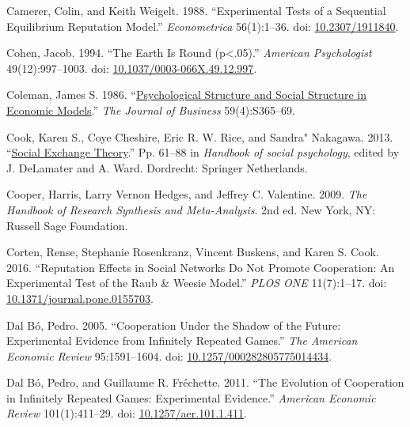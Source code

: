 \documentclass[
  11pt,
]{article}
\newlength{\cslhangindent}
\newlength{\cslentryspacingunit} %
\newenvironment{CSLReferences}[2] %
 {%
  \setlength{\parindent}{0pt}
  \ifodd #1
  \let\oldpar\par
  \def\par{\hangindent=\cslhangindent\oldpar}
  \fi
  \setlength{\parskip}{#2\cslentryspacingunit}
 }%
 {}
\begin{document}
\begin{CSLReferences}{1}{0}
\leavevmode{}%
Camerer, Colin, and Keith Weigelt. 1988. {``Experimental Tests of a Sequential Equilibrium Reputation Model.''} \emph{Econometrica} 56(1):1--36. doi: \href{https://doi.org/10.2307/1911840}{10.2307/1911840}.

\leavevmode{}%
Cohen, Jacob. 1994. {``The Earth Is Round (p{\enspace}\textless{}{\enspace}.05).''} \emph{American Psychologist} 49(12):997--1003. doi: \href{https://doi.org/10.1037/0003-066X.49.12.997}{10.1037/0003-066X.49.12.997}.

\leavevmode{}%
Coleman, James S. 1986. {``\href{http://www.jstor.org/stable/2352767}{Psychological Structure and Social Structure in Economic Models}.''} \emph{The Journal of Business} 59(4):S365--69.

\leavevmode{}%
Cook, Karen S., Coye Cheshire, Eric R. W. Rice, and Sandra" Nakagawa. 2013. {``\href{https://doi.org/10.1007/978-94-007-6772-0_3}{Social Exchange Theory}.''} Pp. 61--88 in \emph{Handbook of social psychology}, edited by J. DeLamater and A. Ward. Dordrecht: Springer Netherlands.

\leavevmode{}%
Cooper, Harris, Larry Vernon Hedges, and Jeffrey C. Valentine. 2009. \emph{The Handbook of Research Synthesis and Meta-Analysis}. 2nd ed. New York, NY: Russell Sage Foundation.

\leavevmode{}%
Corten, Rense, Stephanie Rosenkranz, Vincent Buskens, and Karen S. Cook. 2016. {``Reputation Effects in Social Networks Do Not Promote Cooperation: An Experimental Test of the Raub \& Weesie Model.''} \emph{PLOS ONE} 11(7):1--17. doi: \href{https://doi.org/10.1371/journal.pone.0155703}{10.1371/journal.pone.0155703}.

\leavevmode{}%
Dal Bó, Pedro. 2005. {``Cooperation Under the Shadow of the Future: Experimental Evidence from Infinitely Repeated Games.''} \emph{The American Economic Review} 95:1591--1604. doi: \href{https://doi.org/10.1257/000282805775014434}{10.1257/000282805775014434}.

\leavevmode{}%
Dal Bó, Pedro, and Guillaume R. Fréchette. 2011. {``The Evolution of Cooperation in Infinitely Repeated Games: Experimental Evidence.''} \emph{American Economic Review} 101(1):411--29. doi: \href{https://doi.org/10.1257/aer.101.1.411}{10.1257/aer.101.1.411}.


\end{CSLReferences}
\end{document}
